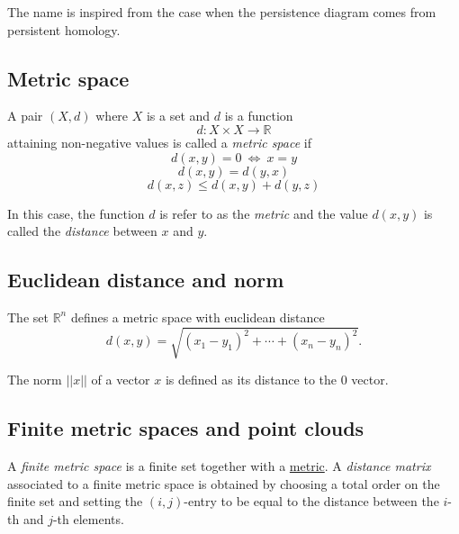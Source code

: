 \documentclass{amsart}
\begin{document}
	The name is inspired from the case when the persistence diagram comes from persistent homology.
	
	\subsection*{Metric space} \label{metric space}
	
	A pair $(X, d)$ where $X$ is a set and $d$ is a function 
	\begin{equation*}
	d : X \times X \to \mathbb R
	\end{equation*}
	attaining non-negative values is called a \textit{metric space} if
	\begin{equation*}
	d(x,y) = 0\ \Leftrightarrow\ x = y
	\end{equation*}
	\begin{equation*}
	d(x,y) = d(y,x)
	\end{equation*}
	\begin{equation*}
	d(x,z) \leq d(x,y) + d(y, z)
	\end{equation*}
	
	In this case, the function $d$ is refer to as the \textit{metric} and the value $d(x,y)$ is called the \textit{distance} between $x$ and $y$. 
	
	\subsection*{Euclidean distance and norm} \label{euclidean distance and norm}
	
	The set $\mathbb R^n$ defines a metric space with euclidean distance
	\begin{equation*}
	d(x,y) = \sqrt{(x_1-y_1)^2 + \cdots + (x_n-y_n)^2}.
	\end{equation*}
	
	The norm $||x||$ of a vector $x$ is defined as its distance to the $0$ vector.
	
	\subsection*{Finite metric spaces and point clouds} \label{finite metric spaces and point clouds}
	
	A \textit{finite metric space} is a finite set together with a \hyperref[metric space]{metric}. A \textit{distance matrix} associated to a finite metric space is obtained by choosing a total order on the finite set and setting the $(i,j)$-entry to be equal to the distance between the $i$-th and $j$-th elements. 
	
\end{document}
